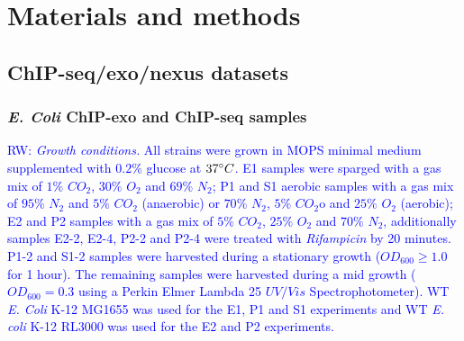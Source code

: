 \documentclass{bmcart}
\newcommand{\RW}[1]{\textcolor{blue}{RW: #1}}
\newcommand{\sig}{\sigma^{70}}
\begin{document}
\section*{Materials and methods}
\label{sec:methods}

\subsection*{ChIP-seq/exo/nexus datasets}

\subsubsection*{\textit{E. Coli} ChIP-exo and ChIP-seq samples}

\RW{
\textit{Growth conditions.} All strains were grown in MOPS minimal
medium supplemented with $0.2\%$ glucose \cite{neidhardt74} at
$37\degree C$. E1 samples were sparged with a gas mix of $1\%$ $CO_2$,
$30\%$ $O_2$ and $69\%$ $N_2$; P1 and S1 aerobic samples with a gas
mix of $95\%$ $N_2$ and $5\%$ $CO_2$ (anaerobic) or $70\%$ $N_2$,
$5\%$ $CO_2$o and $25\%$ $O_2$ (aerobic); E2 and P2 samples with a gas
mix of $5\%$ $CO_2$, $25\%$ $O_2$ and $70\%$ $N_2$, additionally
samples E2-2, E2-4, P2-2 and P2-4 were treated with
\textit{Rifampicin} by 20 minutes. P1-2 and S1-2 samples were
harvested during a stationary growth ($OD_{600} \geq 1.0$ for 1
hour). The remaining samples were harvested during a mid growth
($OD_{600} = 0.3$ using a Perkin Elmer Lambda 25 $UV/Vis$
Spectrophotometer). WT \textit{E. Coli} K-12 MG1655 was used for the
E1, P1 and S1 experiments and WT \textit{E. coli} K-12 RL3000 was used
for the E2 and P2 experiments.}
\end{document}
